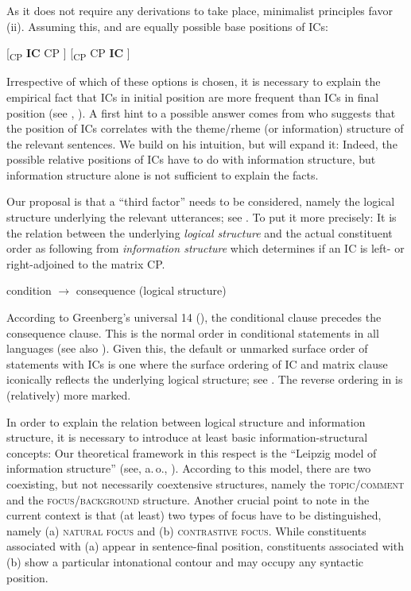 \documentclass[output=paper,colorlinks,citecolor=brown,
modfonts,newtxmath
]{langscibook}
\begin{document}
\noindent As it does not require any derivations to take place, minimalist principles favor (ii). Assuming this,  and  are equally possible base positions of ICs:

\ea
\ea\label{tree:left}
{[\textsubscript{CP} \textbf{IC} CP ]}
\ex\label{tree:right}
{[\textsubscript{CP} CP \textbf{IC} ]}
\z
\z

\noindent Irrespective of which of these options is chosen, it is necessary to explain the empirical fact that ICs in initial position are more frequent than ICs in final position (see \citealt[74--75]{Svoboda1960a}, \citealt{Milotova2011,Milotova2012}). A first hint to a possible answer comes from \citet[75]{Svoboda1960a} who suggests that the position of ICs correlates with the theme/rheme (or information) structure of the relevant sentences. We build on his intuition, but will expand it: Indeed, the possible relative positions of ICs have to do with information structure, but information structure alone is not sufficient to explain the facts. 

Our proposal is that a ``third factor'' needs to be considered, namely the logical structure underlying the relevant utterances; see . To put it more precisely: It is the relation between the underlying \textit{logical structure} and the actual constituent order as following from \textit{information structure} which determines if an IC is left- or right-adjoined to the matrix CP.

\ea\label{ex:logical}
condition $\rightarrow$ consequence \hfill (logical structure)
\z

\noindent According to Greenberg's universal 14 (\citealt[66]{Greenberg1963}), the conditional clause precedes the consequence clause. This is the normal order in conditional statements in all languages (see also \citealt[445--446]{Diessel2001}). Given this, the default or unmarked surface order of statements with ICs is one where the surface ordering of IC and matrix clause iconically reflects the underlying logical structure; see . The reverse ordering in  is (relatively) more marked.

In order to explain the relation between logical structure and information structure, it is necessary to introduce at least basic information-structural concepts: Our theoretical framework in this respect is the ``Leipzig model of information structure'' (see, a.\,o., \citealt{JunghannsZybatow2009}). According to this model, there are two coexisting, but not necessarily coextensive structures, namely the \textsc{topic/comment} and the \textsc{focus/background} structure. Another crucial point to note in the current context is that (at least) two types of focus have to be distinguished, namely (a) \textsc{natural focus} and (b) \textsc{contrastive focus}. While constituents associated with (a) appear in sentence-final position, constituents associated with (b) show a particular intonational contour and may occupy any syntactic position.
\end{document}
